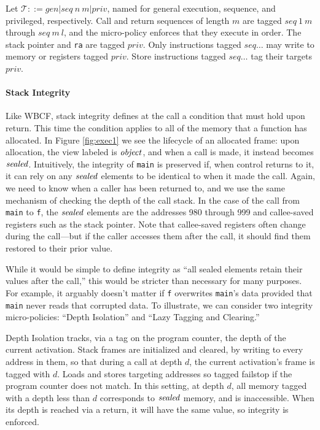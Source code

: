 \documentclass[10pt,conference]{ieeetran}%
\theoremstyle{definition}
\begin{document}
Let \(\mathcal{T} ::= \mathit{gen} | \mathit{seq} ~ n ~ m | \mathit{priv}\), named for general
execution, sequence, and privileged, respectively. Call and return sequences of length \(m\) are
tagged \(\mathit{seq} ~ 1 ~ m\) through \(\mathit{seq} ~ m ~ l\), and the micro-policy enforces
that they execute in order. The stack pointer and {\tt ra}
are tagged \(\mathit{priv}\). Only instructions tagged \(\mathit{seq} \dots\) may write to memory
or registers tagged \(\mathit{priv}\). Store instructions tagged \(\mathit{seq} \dots\) tag their
targets \(\mathit{priv}\).

\paragraph*{Stack Integrity}

Like WBCF, stack integrity defines at the call a condition that must hold upon
return. This time the condition applies to all of the memory that a function has
allocated. In Figure \ref{fig:exec1} we see the lifecycle of an allocated frame:
upon allocation, the view labeled is \(\mathit{object}\), and when a call is made, it instead
becomes \(\mathit{sealed}\). Intuitively, the integrity of {\tt main}
is preserved if, when control returns to it, it can rely on any \(\mathit{sealed}\) elements
to be identical to when it made the call.
%
Again, we need to know when a caller has been returned to,
and we use the same mechanism of checking the depth of the call stack.
%
In the case of the call from {\tt main} to {\tt f}, the \(\mathit{sealed}\) elements are the
addresses 980 through 999 and callee-saved registers such as
the stack pointer. Note that callee-saved registers often change
during the call---but if the caller accesses them after the call, it should find them
restored to their prior value.

While it would be simple to define integrity as ``all sealed elements retain their
values after the call,'' this would be stricter than necessary for many purposes.
For example, it arguably doesn't matter if {\tt f} overwrites {\tt main}'s data provided
that {\tt main} never reads that corrupted data.
To illustrate, we can consider two integrity micro-policies: ``Depth Isolation'' and
``Lazy Tagging and Clearing.''

Depth Isolation tracks, via a tag on the program counter,
the depth of the current activation. Stack frames are initialized and cleared, by writing
to every address in them, so that during a call at depth \(d\), the current activation's
frame is tagged with \(d\). Loads and stores targeting addresses so tagged failstop
if the program counter does not match. In this setting, at depth \(d\), all memory tagged
with a depth less than \(d\) corresponds to \(\mathit{sealed}\) memory, and is inaccessible.
When its depth is reached via a return, it will have the same value, so integrity is
enforced.
\end{document}

